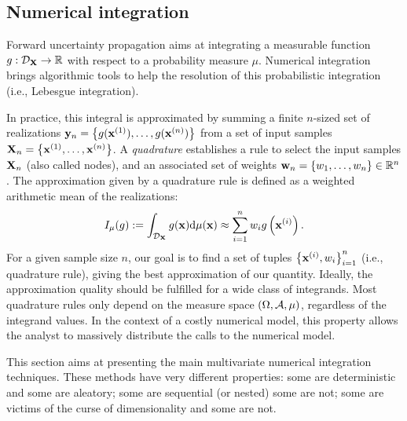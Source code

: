 \subsection{Numerical integration}

Forward uncertainty propagation aims at integrating a measurable function $g: \mathcal{D}_{{\bf X}} \rightarrow \mathbb{R}$ with respect to a probability measure $\mu$.
Numerical integration brings algorithmic tools to help the resolution of this probabilistic integration (i.e., Lebesgue integration). 

In practice, this integral is approximated by summing a finite $n$-sized set of realizations ${\bf y}_n = \left\{g({\bf x}^{(1)}), \dots, g({\bf x}^{(n)})\right\}$ from a set of input samples ${\bf X}_n = \left\{{\bf x}^{(1)}, \dots, {\bf x}^{(n)}\right\}$. 
A \textit{quadrature} establishes a rule to select the input samples ${\bf X}_n$ (also called nodes), and an associated set of weights ${\bf w}_n = \{w_1, \dots, w_n\} \in \mathbb{R}^n$. 
The approximation given by a quadrature rule is defined as a weighted arithmetic mean of the realizations:
\begin{equation}
    I_{\mu}(g) := \int_{\mathcal{D}_{\bf X}} g({\bf x}) \mathrm{d}\mu({\bf x}) \approx \sum_{i=1}^n w_i g\left({\bf x}^{(i)}\right).
    \label{eq:quadrature_rule}
\end{equation}
For a given sample size $n$, our goal is to find a set of tuples $\left\{{\bf x}^{(i)}, w_i \right\}_{i=1}^n$ (i.e., quadrature rule), giving the best approximation of our quantity. 
Ideally, the approximation quality should be fulfilled for a wide class of integrands. 
Most quadrature rules only depend on the measure space $(\Omega, \mathcal{A}, \mu)$, regardless of the integrand values.
In the context of a costly numerical model, this property allows the analyst to massively distribute the calls to the numerical model. 

This section aims at presenting the main multivariate numerical integration techniques. 
These methods have very different properties: 
some are deterministic and some are aleatory; 
some are sequential (or nested) some are not; 
some are victims of the curse of dimensionality and some are not. 


